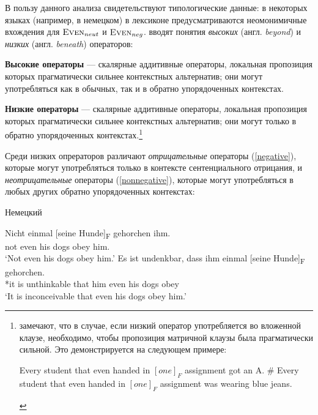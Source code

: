 \documentclass[a4paper, titlepage]{article}
\begin{document}
\medskip

В пользу данного анализа свидетельствуют типологические данные: в некоторых языках (например, в немецком) в лексиконе предусматриваются неомонимичные вхождения для  $ \textsc{Even}_{neut} $ и  $ \textsc{Even}_{neg} $. \citep{gast2011scalar} вводят понятия \textit{высоких} (англ. \textit{beyond}) и  \textit{низких} (англ. \textit{beneath}) операторов:

\begin{exe}
    \ex \textbf{Высокие операторы} --- скалярные аддитивные операторы, локальная пропозиция которых прагматически сильнее контекстных альтернатив; они могут употребляться как в обычных, так и в обратно упорядоченных контекстах.
\end{exe}

\begin{exe}
    \ex \textbf{Низкие операторы} --- скалярные аддитивные операторы, локальная пропозиция которых прагматически сильнее контекстных альтернатив; они могут только в обратно упорядоченных контекстах.\footnote{ \citep{gast2011scalar} замечают, что в случае, если низкий оператор употребляется во вложенной клаузе, необходимо, чтобы пропозиция матричной клаузы была прагматически сильной. Это демонстрируется на следующем примере:
        \begin{exe}
            \ex \begin{xlist}
                \ex Every student that even handed in $ [one]_F $ assignment got an A.
                \ex \# Every student that even handed in $ [one]_F $ assignment was wearing blue jeans.
            \end{xlist}
        \end{exe}}
\end{exe}

Среди низких опрераторов \citep{gast2011scalar} различают \textit{отрицательные} операторы (\ref{negative}), которые могут употребляться только в контексте сентенциального отрицания, и \textit{неотрицательные} операторы (\ref{nonnegative}), которые могут употребляться в любых других обратно упорядоченных контекстах:

\begin{exe}
    \ex \label{negative} {\footnotesize Немецкий} \begin{xlist}
        \ex \label{pitchAccentF}
            \gll Nicht einmal [seine Hunde]\textsubscript{F} gehorchen ihm. \\
                 not even his dogs obey him. \\
            \glt `Not even his dogs obey him.'
        \ex \label{pitchAccentF}
            \gll  *Es ist undenkbar, dass ihm einmal [seine Hunde]\textsubscript{F} gehorchen. \\
                  *it is unthinkable that him even his dogs obey \\
            \glt  `It is inconceivable that even his dogs obey him.'
    \end{xlist}
\end{exe}
\end{document}
